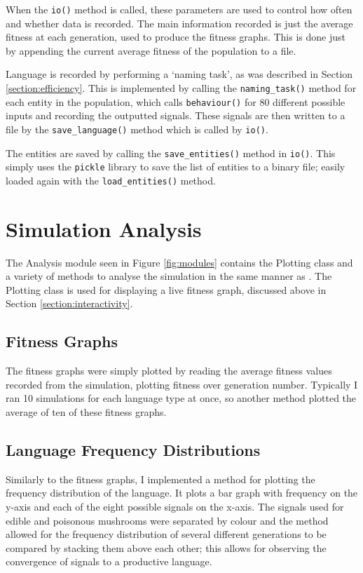 \documentclass[12pt,a4paper,twoside,openright]{report}
\begin{document}
When the \texttt{io()} method is called, these parameters are used to control how often and whether data is recorded. The main information recorded is just the average fitness at each generation, used to produce the fitness graphs. This is done just by appending the current average fitness of the population to a file.

Language is recorded by performing a `naming task', as was described in Section \ref{section:efficiency}. This is implemented by calling the \texttt{naming\_task()} method for each entity in the population, which calls \texttt{behaviour()} for 80 different possible inputs and recording the outputted signals. These signals are then written to a file by the \texttt{save\_language()} method which is called by \texttt{io()}.

The entities are saved by calling the \texttt{save\_entities()} method in \texttt{io()}. This simply uses the \texttt{pickle} library to save the list of entities to a binary file; easily loaded again with the \texttt{load\_entities()} method.

\section{Simulation Analysis}\label{section:impl-analysis}

The Analysis module seen in Figure \ref{fig:modules} contains the Plotting class and a variety of methods to analyse the simulation in the same manner as \citet{Cangelosi1998}. The Plotting class is used for displaying a live fitness graph, discussed above in Section \ref{section:interactivity}.

\subsection{Fitness Graphs}

The fitness graphs were simply plotted by reading the average fitness values recorded from the simulation, plotting fitness over generation number. Typically I ran 10 simulations for each language type at once, so another method plotted the average of ten of these fitness graphs.

\subsection{Language Frequency Distributions}

Similarly to the fitness graphs, I implemented a method for plotting the frequency distribution of the language. It plots a bar graph with frequency on the y-axis and each of the eight possible signals on the x-axis. The signals used for edible and poisonous mushrooms were separated by colour and the method allowed for the frequency distribution of several different generations to be compared by stacking them above each other; this allows for observing the convergence of signals to a productive language.
\end{document}
